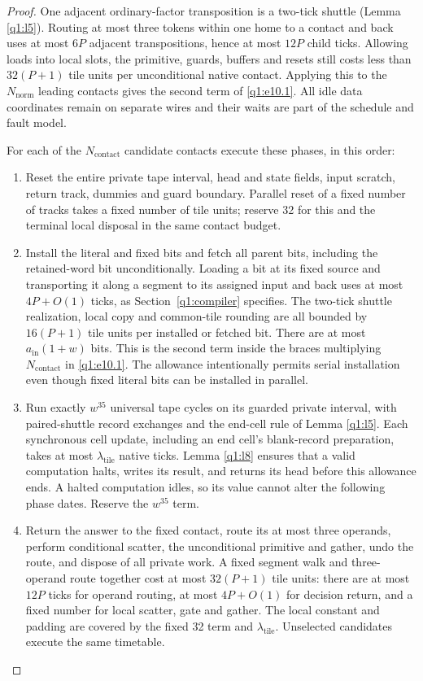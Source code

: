\begin{proof}

One adjacent ordinary-factor transposition is a two-tick shuttle (Lemma \ref{q1:l5}). Routing at most three tokens within one home to a contact and back uses at most \(6P\) adjacent transpositions, hence at most \(12P\) child ticks. Allowing loads into local slots, the primitive, guards, buffers and resets still costs less than \(32(P+1)\) tile units per unconditional native contact. Applying this to the \(N_{\mathrm{norm}}\) leading contacts gives the second term of \eqref{q1:e10.1}. All idle data coordinates remain on separate wires and their waits are part of the schedule and fault model.

For each of the \(N_{\mathrm{contact}}\) candidate contacts execute these phases, in this order:

\begin{enumerate}[label=\textup{Phase \arabic*.},leftmargin=*]
\item Reset the entire private tape interval, head and state fields, input scratch, return track, dummies and guard boundary. Parallel reset of a fixed number of tracks takes a fixed number of tile units; reserve 32 for this and the terminal local disposal in the same contact budget.
\item Install the literal and fixed bits and fetch all parent bits, including the retained-word bit unconditionally. Loading a bit at its fixed source and transporting it along a segment to its assigned input and back uses at most \(4P+O(1)\) ticks, as Section~\ref{q1:compiler} specifies. The two-tick shuttle realization, local copy and common-tile rounding are all bounded by \(16(P+1)\) tile units per installed or fetched bit. There are at most \(a_{\mathrm{in}}(1+w)\) bits. This is the second term inside the braces multiplying \(N_{\mathrm{contact}}\) in \eqref{q1:e10.1}. The allowance intentionally permits serial installation even though fixed literal bits can be installed in parallel.
\item Run exactly \(w^{35}\) universal tape cycles on its guarded private interval, with paired-shuttle record exchanges and the end-cell rule of Lemma \ref{q1:l5}. Each synchronous cell update, including an end cell's blank-record preparation, takes at most \(\lambda_{\mathrm{tile}}\) native ticks. Lemma \ref{q1:l8} ensures that a valid computation halts, writes its result, and returns its head before this allowance ends. A halted computation idles, so its value cannot alter the following phase dates. Reserve the \(w^{35}\) term.
\item Return the answer to the fixed contact, route its at most three operands, perform conditional scatter, the unconditional primitive and gather, undo the route, and dispose of all private work. A fixed segment walk and three-operand route together cost at most \(32(P+1)\) tile units: there are at most \(12P\) ticks for operand routing, at most \(4P+O(1)\) for decision return, and a fixed number for local scatter, gate and gather. The local constant and padding are covered by the fixed 32 term and \(\lambda_{\mathrm{tile}}\). Unselected candidates execute the same timetable.
\end{enumerate}


\end{proof}
